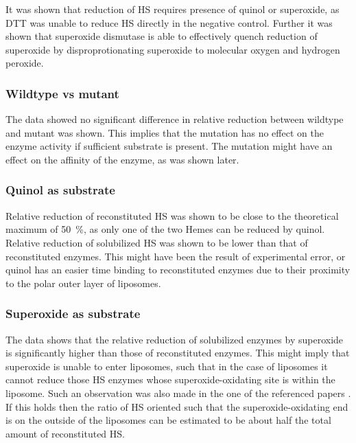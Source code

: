 It was shown that reduction of HS requires presence of quinol or superoxide, as
DTT was unable to reduce HS directly in the negative control. Further it was
shown that superoxide dismutase is able to effectively quench reduction of
superoxide by disproprotionating superoxide to molecular oxygen and hydrogen
peroxide.


\subsubsection{Wildtype vs mutant}

The data showed no significant difference in relative reduction between
wildtype and mutant was shown. This implies that the mutation has no effect on
the enzyme activity if sufficient substrate is present. The mutation might have an
effect on the affinity of the enzyme, as was shown later.

\subsubsection{Quinol as substrate}

Relative reduction of reconstituted HS was shown to be close to the theoretical
maximum of \SI{50}{\percent}, as only one of the two Hemes can be reduced by
quinol. Relative reduction of solubilized HS was shown to be lower than that of
reconstituted enzymes. This might have been the result of experimental error,
or quinol has an easier time binding to reconstituted enzymes due to their
proximity to the polar outer layer of liposomes.

\subsubsection{Superoxide as substrate}

The data shows that the relative reduction of solubilized enzymes by superoxide
is significantly higher than those of reconstituted enzymes. This might imply
that superoxide is unable to enter liposomes, such that in the case of
liposomes it cannot reduce those HS enzymes whose superoxide-oxidating site is
within the liposome. Such an observation was also made in the one of the
referenced papers \cite{superoxide_salvaging}. If this holds then the ratio of
HS oriented such that the superoxide-oxidating end is on the outside of the
liposomes can be estimated to be about half the total amount of reconstituted
HS.

